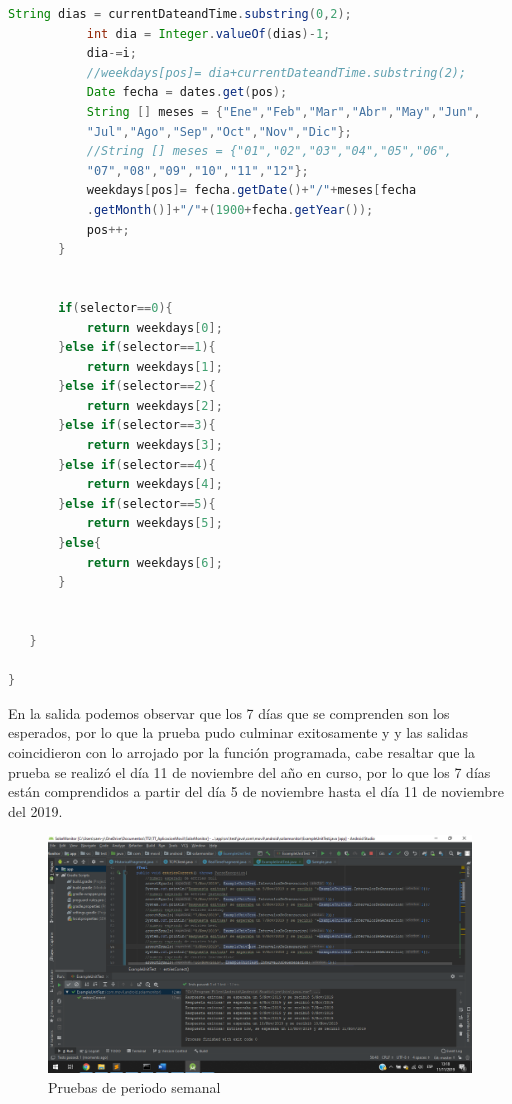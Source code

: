 \begin{lstlisting}[language= Java, frame=single]
           String dias = currentDateandTime.substring(0,2);
           int dia = Integer.valueOf(dias)-1;
           dia-=i;
           //weekdays[pos]= dia+currentDateandTime.substring(2);
           Date fecha = dates.get(pos);
           String [] meses = {"Ene","Feb","Mar","Abr","May","Jun",
           "Jul","Ago","Sep","Oct","Nov","Dic"};
           //String [] meses = {"01","02","03","04","05","06",
           "07","08","09","10","11","12"};
           weekdays[pos]= fecha.getDate()+"/"+meses[fecha
           .getMonth()]+"/"+(1900+fecha.getYear());
           pos++;
       }


       if(selector==0){
           return weekdays[0];
       }else if(selector==1){
           return weekdays[1];
       }else if(selector==2){
           return weekdays[2];
       }else if(selector==3){
           return weekdays[3];
       }else if(selector==4){
           return weekdays[4];
       }else if(selector==5){
           return weekdays[5];
       }else{
           return weekdays[6];
       }


   }

}


\end{lstlisting}

En la salida podemos observar que los 7 días que se comprenden son los esperados, por lo que la prueba pudo culminar exitosamente y y las salidas coincidieron con lo arrojado por la función programada, cabe resaltar que la prueba se realizó el día 11 de noviembre del año en curso, por lo que los 7 días están comprendidos a partir del día 5 de noviembre hasta el día 11 de noviembre del 2019. \\ \newline

\begin{figure}[H]
	\centering
	\includegraphics[scale=.4]{Capitulo5/images/PruebasSemanalPeriodo.png}
	\caption{Pruebas de periodo semanal}
	\label{fig:Pruebas_de_periodo_semanal}
\end{figure}

